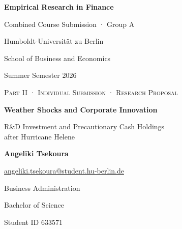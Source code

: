 \begin{titlepage}
  \thispagestyle{empty}
  \singlespacing
  \centering

  \vspace*{0.5cm}

  {\fontsize{28}{30}\bfseries\selectfont
  Empirical Research in Finance\par
  }

  \vspace*{0.5cm}

  {\fontsize{18}{14}\selectfont
  Combined Course Submission · Group A\par
  }

  \vspace*{0.75cm}

  {\fontsize{10}{12}\selectfont
  Humboldt-Universität zu Berlin\par
  \vspace*{0.15cm}
  School of Business and Economics\par
  \vspace*{0.15cm}
  Summer Semester 2026\par
  }

  \vspace*{2cm}

  {\fontsize{12}{10}\scshape\selectfont
  Part II · Individual Submission · Research Proposal\par
  }

  \vspace*{0.35cm}

  {\fontsize{20}{16}\bfseries\selectfont
  Weather Shocks and Corporate Innovation\par
  }

  \vspace*{0.35cm}

  {\fontsize{13}{16}\selectfont
    R\&D Investment and Precautionary Cash Holdings\\
    after Hurricane Helene\par
  }

  \vspace*{2cm}

  \noindent

  \begin{minipage}[t]{0.45\textwidth}
    \centering
    {\large \bfseries Angeliki Tsekoura\par}
    \vspace*{0.12cm}
    {\href{mailto:angeliki.tsekoura@student.hu-berlin.de}{angeliki.tsekoura@student.hu-berlin.de}\par}
    {Business Administration\par}
    {Bachelor of Science\par}
    {Student ID 633571\par}
  \end{minipage}
  \par


\end{titlepage}
